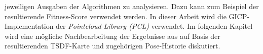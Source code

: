 jeweiligen Ausgaben der Algorithmen zu analysieren. Dazu kann zum Beispiel der resultierende Fitness-Score verwendet werden. In dieser Arbeit wird die GICP-Implementation der \emph{Pointcloud-Library (PCL)} \cite{rusu20113d} verwendet. Im folgenden Kapitel wird eine mögliche Nachbearbeitung der Ergebnisse aus \citep{HATSDF} auf Basis der resultierenden TSDF-Karte und zugehörigen Pose-Historie diskutiert.